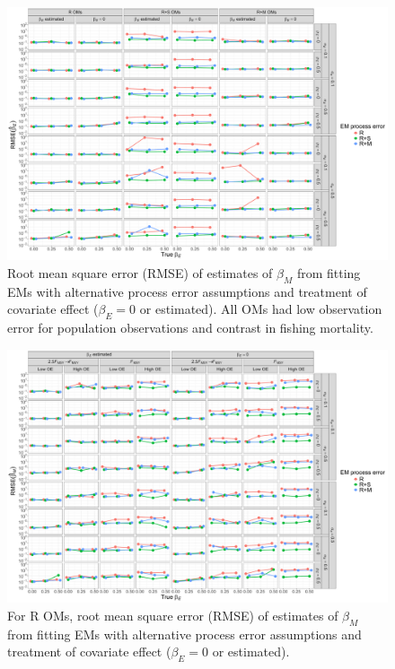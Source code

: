 \documentclass[
  12pt,
]{article}
\begin{document}
\begin{landscape}
\begin{figure}
\begin{center}
\includegraphics[height = \textheight]{beta_M_rmse_main}
\end{center}
\caption{Root mean square error  (RMSE) of estimates of  $\beta_M$ from fitting EMs with alternative process error assumptions and treatment of covariate effect ($\beta_E = 0$ or estimated). All OMs had low observation error for population observations and contrast in fishing mortality.}\label{beta_M_rmse}
\end{figure}
\end{landscape}

\begin{landscape}
\begin{figure}
\begin{center}
\includegraphics[height = \textheight]{beta_M_rmse_Rom}
\end{center}
\caption{For R OMs, root mean square error (RMSE) of estimates of  $\beta_M$ from fitting EMs with alternative process error assumptions and treatment of covariate effect ($\beta_E = 0$ or estimated).}\label{beta_M_rmse_Rom}
\end{figure}
\end{landscape}
\end{document}
